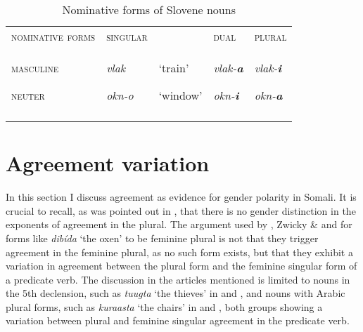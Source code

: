 \documentclass[output=paper]{langsci/langscibook}
\begin{document}
 
\begin{table}
\caption{Nominative forms of Slovene nouns}
\label{tab:8}
\begin{tabularx}{\textwidth}{XXXXX}
\lsptoprule
{\textsc{nominative forms}} & {\textsc{singular}} &  & {\textsc{dual}} & {\textsc{plural}}\\
{\textsc{masculine}}

{\textsc{neuter}} & {\textit{vlak}}

{\textit{okn-o}} & {‘train’}

{‘window’} & {\textit{vlak-}\textbf{\textit{a}}}

{\textit{okn-}\textbf{\textit{i}}} & {\textit{vlak-}\textbf{\textit{i}}}

{\textit{okn-}\textbf{\textit{a}}}\\
\lspbottomrule
\end{tabularx}

\end{table} 

\section{Agreement variation}

In this section I discuss agreement as evidence for gender polarity in Somali. It is crucial to recall, as was pointed out in , that there is no gender distinction in the exponents of agreement in the plural. The argument used by \citet{Hetzron1972}, Zwicky \& \citet{Pullum1983} and \citet{Lecarme2002} for forms like \textit{dibída} ‘the oxen’ to be feminine plural is not that they trigger agreement in the feminine plural, as no such form exists, but that they exhibit a variation in agreement between the plural form and the feminine singular form of a predicate verb. The discussion in the articles mentioned is limited to nouns in the 5th declension, such as \textit{tuugta} ‘the thieves’ in  and , and nouns with Arabic plural forms, such as \textit{kuraasta} ‘the chairs’ in  and , both groups showing a variation between plural and feminine singular agreement in the predicate verb.
\end{document}
